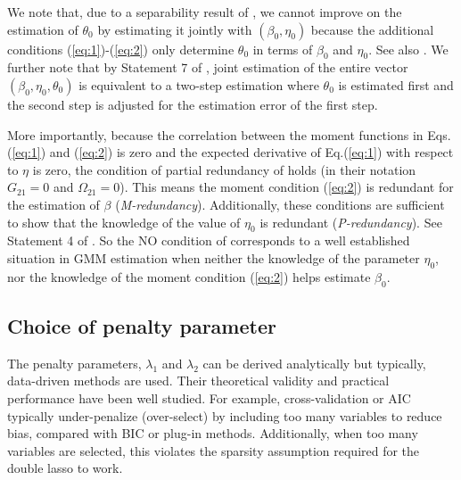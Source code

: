 \documentclass[11pt]{article}
\begin{document}
We note that, due to a separability result of  \cite{ahn/schmidt:95}, we cannot improve on the estimation of $\theta_0$ by estimating it jointly with $(\beta_0, \eta_0)$ %
because the additional conditions (\ref{eq:1})-(\ref{eq:2}) only determine $\theta_0$ in terms of 
$\beta_0$ and $\eta_0$. See also \citet[][Statement 6]{prokhorov/schmidt:09}. We further note that by Statement 7 of \cite{prokhorov/schmidt:09}, joint estimation of the entire vector $(\beta_0, \eta_0, \theta_0)$ is equivalent to a two-step estimation where $\theta_0$ is estimated first and the second step is adjusted for the estimation error of the first step. 

More importantly, because the correlation between the moment functions in Eqs.(\ref{eq:1}) and (\ref{eq:2}) is zero and the expected derivative of Eq.(\ref{eq:1}) with respect to $\eta$ is zero, the condition of partial redundancy of \citet[][Theorem 7]{breusch/etal:99} holds (in their notation $G_{21}=0$ and $\Omega_{21}=0$). This means the moment condition (\ref{eq:2}) is redundant for the estimation of $\beta$ (\emph{M-redundancy}). Additionally, these conditions are sufficient to show that the knowledge of the value of $\eta_0$ is redundant (\emph{P-redundancy}). See Statement 4 of \cite{prokhorov/schmidt:09}. So the NO condition of   \cite{bellonichernozhukovwei2016} corresponds to a well established situation in GMM estimation when neither the knowledge of the parameter $\eta_0$, nor the knowledge of the moment condition (\ref{eq:2}) helps estimate $\beta_0$. %

	\subsection{Choice of penalty parameter}
The penalty parameters, $\lambda_1$ and $\lambda_2$ can be derived analytically but typically, data-driven methods are used. Their theoretical validity and practical performance have been well studied. For example, cross-validation or AIC typically under-penalize (over-select) by including too many variables to reduce bias, compared with BIC or plug-in methods. %
Additionally, when too many variables are selected, this violates the sparsity assumption required for the double lasso to work. 
\end{document}
